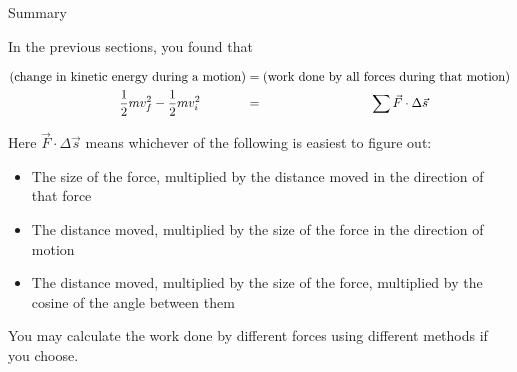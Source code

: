 \documentclass[12pt]{article}
\begin{document}
\vspace{2.5in}

{\Large Summary}

In the previous sections, you found that

\begin{align*}
\text{(change in kinetic energy during a motion)} &= \text {(work done by all forces during that motion)} \\
\frac{1}{2}mv_f^2 - \frac{1}{2}mv_i^2 \hspace{0.5in} &= \hspace{1.2in}\sum \vec F \cdot \Delta \vec s
\end{align*}

Here $\vec F \cdot \Delta \vec s$ means whichever of the following is easiest to figure out:

\begin{itemize}
\item The size of the force, multiplied by the distance moved in the direction of that force
\item The distance moved, multiplied by the size of the force in the direction of motion
\item The distance moved, multiplied by the size of the force, multiplied by the cosine of the angle between them
\end{itemize}

You may calculate the work done by different forces using different methods if you choose.
\newpage
\end{document}
